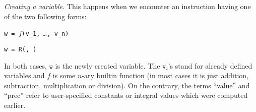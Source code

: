 \documentclass[sigconf]{acmart}
\newcommand{\ttv}{\texttt{v}\xspace}
\newcommand{\ttw}{\texttt{w}\xspace}
\theoremstyle{definition}
\begin{document}
\smallskip

\noindent \textit{Creating a variable.}
%
This happens when we encounter an instruction having one of the
two following forms:

\medskip

\noindent \hspace{5mm} \makebox[2.5cm]{[Computation]\hfill\null}
\verb?w = ?$f$\verb?(v_1,? \ldots\verb?, v_n)?

\smallskip

\noindent \hspace{5mm} 
\verb?w = ?\verb?R(?\verb?, ?\verb?)?

\medskip

\noindent
In both cases, $\ttw$ is the newly created variable. 
The $\ttv_i$'s stand for already defined variables and $f$ is some 
$n$-ary builtin function (in most cases it is just addition, 
subtraction, multiplication or division). On the contrary, the terms 
``value'' and ``prec'' refer to user-specified constants or integral 
values which were computed earlier.

\smallskip
\end{document}
